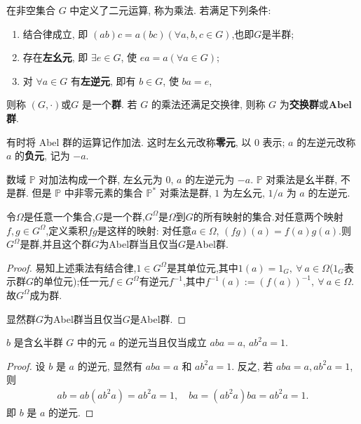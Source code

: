 \documentclass[../../main.tex]{subfiles}%
\begin{document}
\begin{definition}[群]
在非空集合 \( G \) 中定义了二元运算, 称为乘法. 若满足下列条件:
\begin{enumerate}[(1)]
\item 结合律成立, 即 \( (ab)c = a(bc) (\forall a,b,c \in G) \),也即$G$是半群;

\item 存在\textbf{左幺元}, 即 \( \exists e \in G \), 使 \( ea = a (\forall a \in G) \);

\item 对 \( \forall a \in G \) 有\textbf{左逆元}, 即有 \( b \in G \), 使 \( ba = e \),
\end{enumerate}
则称 $(G,\cdot)$或\( G \) 是一个\textbf{群}. 若 \( G \) 的乘法还满足交换律, 则称 \( G \) 为\textbf{交换群}或$\mathbf{Abel}$\textbf{群}.

有时将 Abel 群的运算记作加法. 这时左幺元改称\textbf{零元}, 以 $0$ 表示; $a$ 的左逆元改称 $a$ 的\textbf{负元}, 记为 $-a$.
\end{definition}
\begin{remark}
数域 $\mathbb{P}$ 对加法构成一个群, 左幺元为 $0$, $a$ 的左逆元为 $-a$. $\mathbb{P}$ 对乘法是幺半群, 不是群. 但是 $\mathbb{P}$ 中非零元素的集合 $\mathbb{P}^*$ 对乘法是群, $1$ 为左幺元, $1/a$ 为 $a$ 的左逆元.
\end{remark}

\begin{example}
令$\Omega$是任意一个集合,$G$是一个群,$G^\Omega$是$\Omega$到$G$的所有映射的集合.对任意两个映射$f,g \in G^\Omega$,定义乘积$fg$是这样的映射: 对任意$a \in \Omega$, $(fg)(a) = f(a)g(a)$.则$G^\Omega$是群,并且这个群$G$为Abel群当且仅当$G$是Abel群.
\end{example}
\begin{proof}

易知上述乘法有结合律,$1 \in G^\Omega$是其单位元,其中$1(a) = 1_G,\ \forall\ a \in \Omega$($1_G$表示群$G$的单位元);任一元$f \in G^\Omega$有逆元$f^{-1}$,其中$f^{-1}(a) := (f(a))^{-1},\ \forall\ a \in \Omega$.故$G^\Omega$成为群.

显然群$G$为Abel群当且仅当$G$是Abel群.

\end{proof}

\begin{example}
$b$ 是含幺半群 $G$ 中的元 $a$ 的逆元当且仅当成立 $aba = a$, $ab^2a = 1$.
\end{example}
\begin{proof}

设 $b$ 是 $a$ 的逆元, 显然有 $aba = a$ 和 $ab^2a = 1$. 反之, 若 $aba = a, ab^2a = 1$, 则
\begin{align*}
ab = ab(ab^2a) = ab^2a = 1, \quad ba = (ab^2a)ba = ab^2a = 1.
\end{align*}
即 $b$ 是 $a$ 的逆元.

\end{proof}
\end{document}
